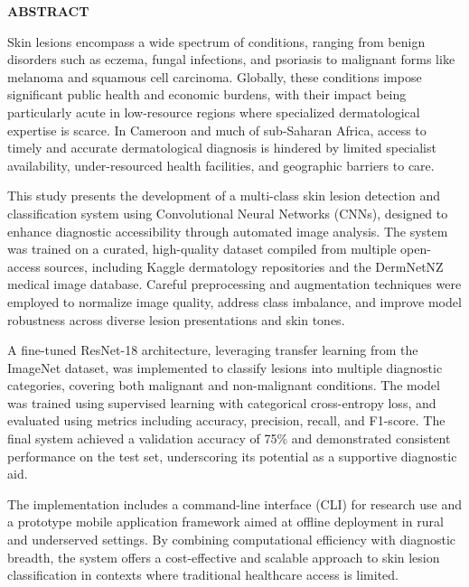 \documentclass[
  12pt,
  oneside]{article}
\begin{document}
\vfill
\clearpage

\thispagestyle{empty}
\begin{center}
\textbf{\Large ABSTRACT}
\end{center}

\vspace{1cm}

Skin lesions encompass a wide spectrum of conditions, ranging from benign disorders such as eczema, fungal infections, and psoriasis to malignant forms like melanoma and squamous cell carcinoma. Globally, these conditions impose significant public health and economic burdens, with their impact being particularly acute in low-resource regions where specialized dermatological expertise is scarce. In Cameroon and much of sub-Saharan Africa, access to timely and accurate dermatological diagnosis is hindered by limited specialist availability, under-resourced health facilities, and geographic barriers to care. 

This study presents the development of a multi-class skin lesion detection and classification system using Convolutional Neural Networks (CNNs), designed to enhance diagnostic accessibility through automated image analysis. The system was trained on a curated, high-quality dataset compiled from multiple open-access sources, including Kaggle dermatology repositories and the DermNetNZ medical image database. Careful preprocessing and augmentation techniques were employed to normalize image quality, address class imbalance, and improve model robustness across diverse lesion presentations and skin tones.

A fine-tuned ResNet-18 architecture, leveraging transfer learning from the ImageNet dataset, was implemented to classify lesions into multiple diagnostic categories, covering both malignant and non-malignant conditions. The model was trained using supervised learning with categorical cross-entropy loss, and evaluated using metrics including accuracy, precision, recall, and F1-score. The final system achieved a validation accuracy of 75\% and demonstrated consistent performance on the test set, underscoring its potential as a supportive diagnostic aid.

The implementation includes a command-line interface (CLI) for research use and a prototype mobile application framework aimed at offline deployment in rural and underserved settings. By combining computational efficiency with diagnostic breadth, the system offers a cost-effective and scalable approach to skin lesion classification in contexts where traditional healthcare access is limited. 
\end{document}

